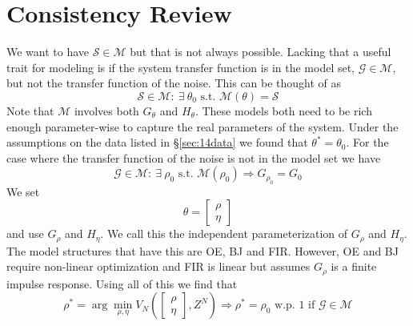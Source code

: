 \section{Consistency Review}
We want to have $\mathcal{S}\in\mathcal{M}$ but that is not always possible. Lacking that a useful trait for modeling is if the system transfer function is in the model set, $\mathcal{G}\in\mathcal{M}$, but not the transfer function of the noise. This can be thought of as
$$\mathcal{S}\in\mathcal{M}:~\exists~\theta_0 \text{ s.t. } \mathcal{M}(\theta)=\mathcal{S}$$
Note that $\mathcal{M}$ involves both $G_\theta$ and $H_\theta$. These models both need to be rich enough parameter-wise to capture the real parameters of the system. Under the assumptions on the data listed in \S\ref{sec:14data} we found that $\theta^\ast=\theta_0$. For the case where the transfer function of the noise is not in the model set we have
$$\mathcal{G}\in\mathcal{M}:~\exists~\rho_0 \text{ s.t. } \mathcal{M}(\rho_0) \Rightarrow G_{\rho_0}=G_0$$
We set
$$\theta = \left[\begin{array}{c} \rho \\ \eta \end{array}\right]$$
and use $G_\rho$ and $H_\eta$. We call this the independent parameterization of $G_\rho$ and $H_\eta$. The model structures that have this are OE, BJ and FIR. However, OE and BJ require non-linear optimization and FIR is linear but assumes $G_\rho$ is a finite impulse response. Using all of this we find that
$$\rho^\ast = \arg\min_{\rho,\eta} V_N\left(\left[\begin{array}{c} \rho \\ \eta \end{array}\right],Z^N\right) \Rightarrow \rho^\ast = \rho_0 \text{ w.p. } 1 \text{ if } \mathcal{G}\in\mathcal{M}$$

